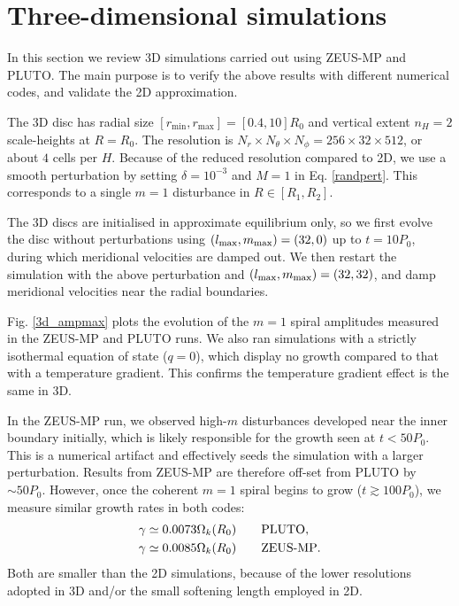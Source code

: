 \section{Three-dimensional simulations}\label{results3d}
In this section we review 3D simulations carried 
out using ZEUS-MP and PLUTO. The main purpose is to verify 
the above results with different numerical codes, and validate  
the 2D approximation.    

The 3D disc has radial size
$[r_\mathrm{min},r_\mathrm{max}]=[0.4,10]R_0$ and vertical extent  
$n_H=2$ scale-heights at $R=R_0$. The resolution is $N_r\times N_\theta\times
N_\phi=256\times32\times512$, or about $4$ cells per
$H$. Because of the reduced resolution 
compared to 2D, we use a smooth perturbation by setting
$\delta = 10^{-3}$ and $M=1$ in Eq. \ref{randpert}. This corresponds
to a single $m=1$ disturbance in $R\in[R_1,R_2]$.

The 3D discs are initialised in approximate equilibrium only, so we
first evolve the disc without perturbations using  
$(l_\mathrm{max},m_\mathrm{max})=(32,0)$ up to $t=10P_0$, during which 
meridional velocities are damped out. We then restart the simulation
with the above perturbation and $(l_\mathrm{max},m_\mathrm{max})=(32,32)$, and damp
meridional velocities near the radial boundaries. 

Fig. \ref{3d_ampmax} plots the evolution of the $m=1$ spiral amplitudes measured
in the ZEUS-MP and PLUTO runs. We also ran simulations
with a strictly isothermal equation of state ($q=0$), which display no
growth compared to that with a temperature gradient.  This confirms
the temperature gradient effect is the same in 3D. 

In the ZEUS-MP run, we observed high-$m$ disturbances developed near 
the inner boundary initially, which is likely responsible for the
growth seen at $t<50P_0$. This is a numerical artifact and effectively
seeds the simulation with a larger perturbation. Results
from ZEUS-MP are therefore off-set from PLUTO by $\sim50P_0$. However,
once the coherent $m=1$ spiral begins to grow ($t\gtrsim 100P_0$), 
we measure similar growth rates in both codes: 
\begin{align*}
  &\gamma \simeq 0.0073\Omega_k(R_0) \quad\quad \mathrm{PLUTO},\\
  &\gamma \simeq 0.0085\Omega_k(R_0) \quad\quad {\operatorname{ZEUS-MP}}.
\end{align*}
Both are smaller than the 2D simulations, because of the 
lower resolutions adopted in 3D and/or the small softening length
employed in 2D. 


